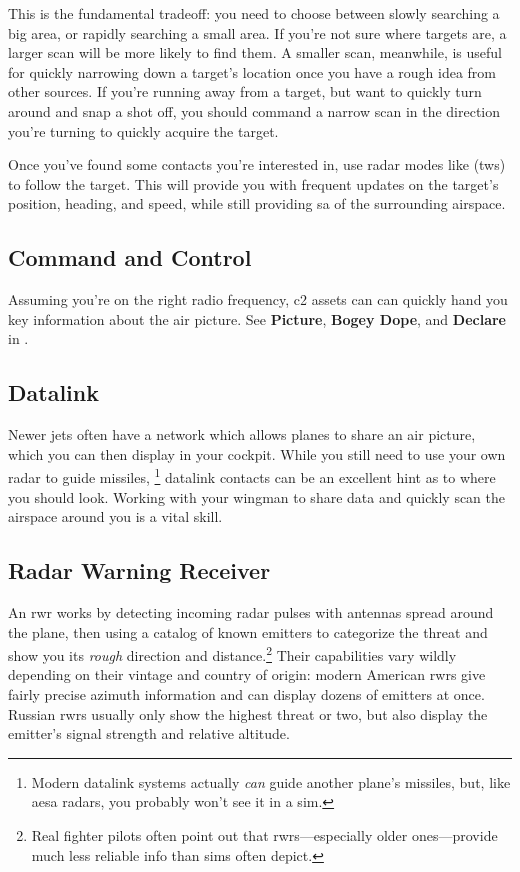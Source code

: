 This is the fundamental tradeoff: you need to choose between
slowly searching a big area, or rapidly searching a small area.
If you're not sure where targets are,
a larger scan will be more likely to find them.
A smaller scan, meanwhile, is useful for quickly narrowing down a target's
location once you have a rough idea from other sources.
If you're running away from a target, but want to quickly turn around and
snap a shot off,
you should command a narrow scan in the direction you're turning
to quickly acquire the target.

Once you've found some contacts you're interested in,
use radar modes like  \ac{(tws)}
to follow the target.
This will provide you with frequent updates on the target's position, heading,
and speed, while still providing \ac{sa} of the surrounding airspace.

\subsection{Command and Control}

Assuming you're on the right radio frequency,
\ac{c2} assets can can quickly hand you key information
about the air picture. See \textbf{Picture}, \textbf{Bogey Dope},
and \textbf{Declare} in .

\subsection{Datalink}

Newer jets often have a  network which allows
planes to share an air picture, which you can then display in your cockpit.
While you still need to use your own radar to guide missiles,\punckern%
\footnote{Modern datalink systems actually \emph{can} guide another plane's
missiles, but, like \ac{aesa} radars, you probably won't see it in a sim.}
datalink contacts can be an excellent hint as to where you should look.
Working with your wingman to share data and quickly scan the airspace around
you is a vital skill.

\subsection{Radar Warning Receiver}

An \ac{rwr} works by detecting incoming radar pulses
with antennas spread around the plane,
then using a catalog of known emitters to categorize the threat
and show you its \emph{rough} direction and distance.\punckern\footnote{Real
fighter pilots often point out that \ac{rwr}s---especially older
ones---provide much less reliable info than sims often depict.}
Their capabilities vary wildly depending on their vintage and country of origin:
modern American \ac{rwr}s give fairly precise azimuth information
and can display dozens of emitters at once.
Russian \ac{rwr}s usually only show the highest threat or two,
but also display the emitter's signal strength and relative altitude.

